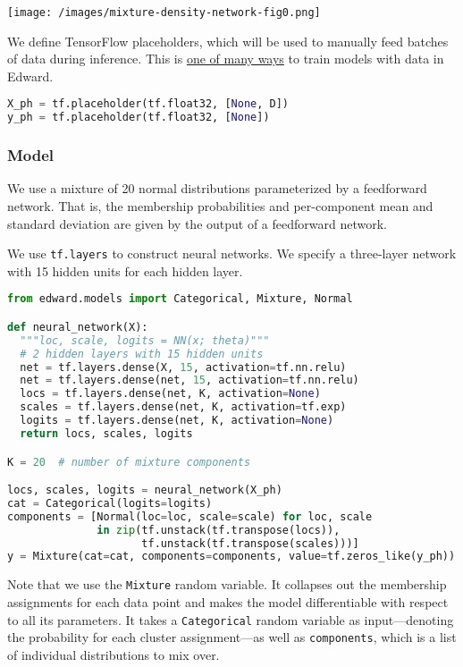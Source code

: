 \texttt{[image: /images/mixture-density-network-fig0.png]}

We define TensorFlow placeholders, which will be used to manually feed batches of data during inference. This is \href{http://edwardlib.org/api/data}{one of many ways} to train models with data in Edward.

\begin{lstlisting}[language=Python]
X_ph = tf.placeholder(tf.float32, [None, D])
y_ph = tf.placeholder(tf.float32, [None])
\end{lstlisting}

\subsubsection{Model}

We use a mixture of 20 normal distributions parameterized by a
feedforward network. That is, the membership probabilities and
per-component mean and standard deviation are given by the output of a
feedforward network.

We use \texttt{tf.layers} to construct neural networks. We specify
a three-layer network with 15 hidden units for each hidden layer.

\begin{lstlisting}[language=Python]
from edward.models import Categorical, Mixture, Normal

def neural_network(X):
  """loc, scale, logits = NN(x; theta)"""
  # 2 hidden layers with 15 hidden units
  net = tf.layers.dense(X, 15, activation=tf.nn.relu)
  net = tf.layers.dense(net, 15, activation=tf.nn.relu)
  locs = tf.layers.dense(net, K, activation=None)
  scales = tf.layers.dense(net, K, activation=tf.exp)
  logits = tf.layers.dense(net, K, activation=None)
  return locs, scales, logits

K = 20  # number of mixture components

locs, scales, logits = neural_network(X_ph)
cat = Categorical(logits=logits)
components = [Normal(loc=loc, scale=scale) for loc, scale
              in zip(tf.unstack(tf.transpose(locs)),
                     tf.unstack(tf.transpose(scales)))]
y = Mixture(cat=cat, components=components, value=tf.zeros_like(y_ph))
\end{lstlisting}

Note that we use the \texttt{Mixture} random variable. It collapses
out the membership assignments for each data point and makes the model
differentiable with respect to all its parameters. It takes a
\texttt{Categorical} random variable as input—denoting the probability for each
cluster assignment—as well as \texttt{components}, which is a list of
individual distributions to mix over.

